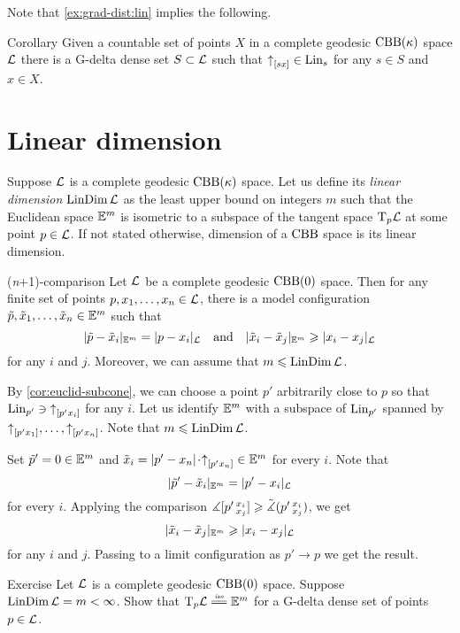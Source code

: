 Note that \ref{ex:grad-dist:lin} implies the following.

\begin{thm}{Corollary}\label{cor:euclid-subcone}
Given a countable set of points $X$ in a complete geodesic $\mathrm{CBB}(\kappa)$ space $\mathcal{L}$
there is a G-delta dense set $S\subset\mathcal{L}$
such that 
${\uparrow}_{[{s}{x}]}\in \mathop{\rm Lin}\nolimits_s$
for any $s\in S$ and $x\in X$.
\end{thm}

\section{Linear dimension}


Suppose $\mathcal{L}$ is a complete geodesic $\mathrm{CBB}(\kappa)$ space.
Let us define its \emph{linear dimension} $\mathop{\rm LinDim}\nolimits \mathcal{L}$ as the least upper bound on integers $m$ such that 
the Euclidean space $\mathbb{E}^m$ is isometric to a subspace of the tangent space $\mathrm{T}_p\mathcal{L}$ at some point $p\in \mathcal{L}$.
If not stated otherwise, dimension of a $\mathrm{CBB}$ space is its linear dimension.

\begin{thm}{(\textit{n}+1)-comparison}
Let $\mathcal{L}$ be a complete geodesic $\mathrm{CBB}(0)$ space.
Then for any finite set of points $p,x_1,\dots,x_n\in \mathcal{L}$, there is a model configuration 
$\tilde p,\tilde x_1,\dots,\tilde x_n\in \mathbb{E}^m$ such that 
\[|\tilde p-\tilde x_i|_{\mathbb{E}^m}=| p- x_i|_{\mathcal{L}}
\quad\text{and}\quad
|\tilde x_i-\tilde x_j|_{\mathbb{E}^m}\geqslant |x_i- x_j|_{\mathcal{L}}\]
for any $i$ and $j$.
Moreover, we can assume that $m\leqslant \mathop{\rm LinDim}\nolimits\mathcal{L}$. 
\end{thm}

By \ref{cor:euclid-subcone}, we can choose a point $p'$ arbitrarily close to $p$ so that 
$\mathop{\rm Lin}\nolimits_{p'}\ni {\uparrow}_{[{p'}{x_i}]}$ for any $i$.
Let us identify $\mathbb{E}^m$ with a subspace of $\mathop{\rm Lin}\nolimits_{p'}$ spanned by ${\uparrow}_{[{p'}{x_1}]},\dots,{\uparrow}_{[{p'}{x_n}]}$.
Note that $m\leqslant \mathop{\rm LinDim}\nolimits\mathcal{L}$.

Set $\tilde p'=0\in \mathbb{E}^m$ and $\tilde x_i=\dist{p'}{x_n}{}\cdot\dir{p'}{x_n}\in \EE^m$ for every $i$.
Note that 
\[|\tilde p'-\tilde x_i|_{\mathbb{E}^m}=| p'- x_i|_{\mathcal{L}}\]
for every $i$.
Applying the comparison $\measuredangle[p'\,{}^{x_i}_{x_j}]\geqslant \tilde\measuredangle(p'\,{}^{x_i}_{x_j})$, we get
\[|\tilde x_i-\tilde x_j|_{\mathbb{E}^m}\geqslant |x_i- x_j|_{\mathcal{L}}\]
for any $i$ and $j$.
Passing to a limit configuration as $p'\to p$ we get the result.
\qeds

\begin{thm}{Exercise}\label{ex:tangent=Em}
Let $\mathcal{L}$ is a complete geodesic $\mathrm{CBB}(0)$ space.
Suppose $\mathop{\rm LinDim}\nolimits\mathcal{L}=m<\infty$.
Show that $\T_p\spc{L}\iso \EE^m$ for a G-delta dense set of points $p\in\mathcal{L}$.
\end{thm}

